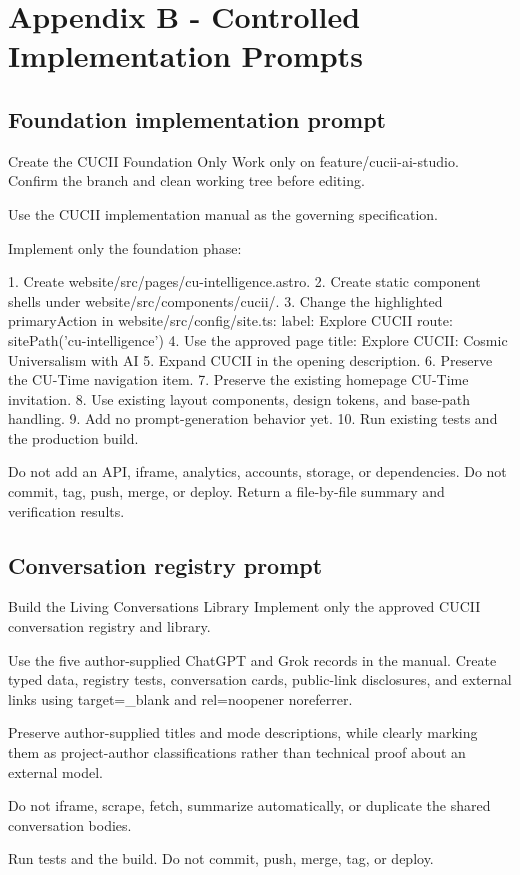 \documentclass[11pt,letterpaper]{article}
\begin{document}
\section{Appendix B - Controlled Implementation Prompts}

\subsection{Foundation implementation prompt}

\begin{promptbox}{Create the CUCII Foundation Only}
Work only on feature/cucii-ai-studio.
Confirm the branch and clean working tree before editing.

Use the CUCII implementation manual as the governing specification.

Implement only the foundation phase:

1. Create website/src/pages/cu-intelligence.astro.
2. Create static component shells under website/src/components/cucii/.
3. Change the highlighted primaryAction in website/src/config/site.ts:
   label: Explore CUCII
   route: sitePath('cu-intelligence')
4. Use the approved page title:
   Explore CUCII: Cosmic Universalism with AI
5. Expand CUCII in the opening description.
6. Preserve the CU-Time navigation item.
7. Preserve the existing homepage CU-Time invitation.
8. Use existing layout components, design tokens, and base-path handling.
9. Add no prompt-generation behavior yet.
10. Run existing tests and the production build.

Do not add an API, iframe, analytics, accounts, storage, or dependencies.
Do not commit, tag, push, merge, or deploy.
Return a file-by-file summary and verification results.
\end{promptbox}

\subsection{Conversation registry prompt}

\begin{promptbox}{Build the Living Conversations Library}
Implement only the approved CUCII conversation registry and library.

Use the five author-supplied ChatGPT and Grok records in the manual.
Create typed data, registry tests, conversation cards, public-link
disclosures, and external links using target=_blank and
rel=noopener noreferrer.

Preserve author-supplied titles and mode descriptions, while clearly
marking them as project-author classifications rather than technical
proof about an external model.

Do not iframe, scrape, fetch, summarize automatically, or duplicate the
shared conversation bodies.

Run tests and the build. Do not commit, push, merge, tag, or deploy.
\end{promptbox}
\end{document}
